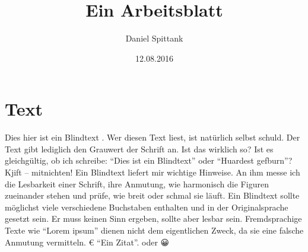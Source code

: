 \documentclass[a4paper]{scrartcl}
\title{Ein Arbeitsblatt}
\author{Daniel Spittank}
\date{12.08.2016}
\begin{document}
\section*{Text}
\begin{zeilenNrMehrspaltig}{4}
    Dies hier ist ein Blindtext . Wer diesen Text liest, ist natürlich
    selbst schuld. Der Text gibt lediglich den Grauwert der Schrift an. Ist das wirklich so?
    Ist es gleichgültig, ob ich schreibe: \enquote{Dies ist ein Blindtext} oder \enquote{Huardest gefburn}?
    Kjift – mitnichten! Ein Blindtext liefert mir wichtige Hinweise. An ihm messe ich
    die Lesbarkeit einer Schrift, ihre Anmutung, wie harmonisch die Figuren zueinander
    stehen und prüfe, wie breit oder schmal sie läuft. Ein Blindtext sollte möglichst viele
    verschiedene Buchstaben enthalten und in der Originalsprache gesetzt sein. Er muss
    keinen Sinn ergeben, sollte aber lesbar sein. Fremdsprachige Texte wie \enquote{Lorem ipsum}
    dienen nicht dem eigentlichen Zweck, da sie eine falsche Anmutung vermitteln. € \enquote{Ein Zitat}.  \SuS oder \KuK 😀 \symUhr
\end{zeilenNrMehrspaltig}
\end{document}
